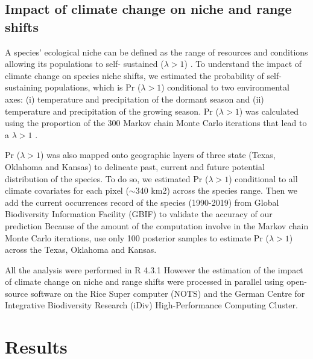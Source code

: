 \documentclass[12pt]{article}
\begin{document}
\subsection*{Impact of climate change on niche and range shifts}
A species' ecological niche can be defined as the range of resources and conditions allowing its populations to self- sustained  ($\lambda > 1$) \citep{maguire1973niche,hutchinson1978introduction}.
To understand the impact of climate change on species niche shifts, we estimated the probability of self- sustaining populations, which is Pr ($\lambda > 1$) conditional to two environmental axes: (i) temperature and precipitation of the dormant season and (ii) temperature and precipitation of the growing season. 
Pr ($\lambda > 1$) was calculated using the proportion of the 300 Markov chain Monte Carlo iterations that lead to a $\lambda > 1$ \citep{diez2014probabilistic}.

Pr ($\lambda > 1$) was also mapped onto geographic layers of three state (Texas, Oklahoma and Kansas) to delineate past, current and future potential distribution of the species.
To do so, we estimated Pr ($\lambda > 1$) conditional to all climate covariates for each pixel ($\sim$340 km2) across the species range. 
Then we add the current occurrences record of the species (1990-2019) from Global Biodiversity Information Facility (GBIF) to validate the accuracy of our prediction
Because of the amount of the computation involve in the Markov chain Monte Carlo iterations, use only 100 posterior samples to estimate Pr ($\lambda > 1$) across the Texas, Oklahoma and Kansas.

All the analysis were performed in R 4.3.1 \citep{RCoreteam}
However the estimation of the impact of climate change on niche and range shifts were processed in parallel using open-source software on the Rice Super computer (NOTS) and the German Centre for Integrative Biodiversity Research (iDiv) High-Performance Computing Cluster.

\section*{Results}
\end{document}
